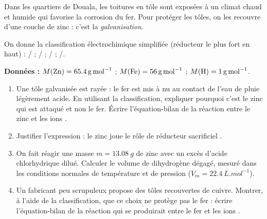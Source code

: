\documentclass[11pt]{article}
\begin{document}
\begin{exercice}
Dans les quartiers de Douala, les toitures en tôle sont exposées à un climat chaud et humide qui favorise la corrosion du fer. Pour protéger les tôles, on les recouvre d'une couche de zinc : c'est la \emph{galvanisation}.

\medskip
On donne la classification électrochimique simplifiée (réducteur le plus fort en haut) :
/ ; / ; / ; /.

\medskip
\textbf{Données :} $M(\ce{Zn}) = \SI{65,4}{g.mol^{-1}}$ ; $M(\ce{Fe}) = \SI{56}{g.mol^{-1}}$ ; $M(\ce{H}) = \SI{1}{g.mol^{-1}}$.

\begin{enumerate}
    \item Une tôle galvanisée est rayée : le fer est mis à nu au contact de l'eau de pluie légèrement acide. En utilisant la classification, expliquer pourquoi c'est le zinc qui est attaqué et non le fer. Écrire l'équation-bilan de la réaction entre le zinc et les ions .
    \item Justifier l'expression : \og le zinc joue le rôle de réducteur sacrificiel \fg.
    \item On fait réagir une masse $m = \SI{13,08}{g}$ de zinc avec un excès d'acide chlorhydrique dilué. Calculer le volume de dihydrogène dégagé, mesuré dans les conditions normales de température et de pression ($V_m = \SI{22,4}{L.mol^{-1}}$).
    \item Un fabricant peu scrupuleux propose des tôles recouvertes de cuivre. Montrer, à l'aide de la classification, que ce choix ne protège pas le fer : écrire l'équation-bilan de la réaction qui se produirait entre le fer et les ions .
\end{enumerate}
\end{exercice}
\end{document}
